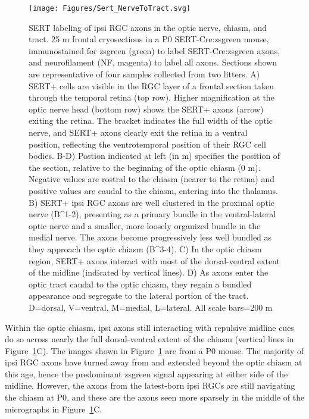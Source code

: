 \begin{figure}[hbtp]
	\begin{center}
		\texttt{[image: Figures/Sert\_NerveToTract.svg]}
		\caption[SERT labeling of ipsi RGC axons in the optic nerve, chiasm, and tract.]
		{SERT labeling of ipsi RGC axons in the optic nerve, chiasm, and tract. 
		25 \mu m frontal cryosections in a P0 SERT-Cre:zsgreen mouse, immunostained for zsgreen (green) to label SERT-Cre:zsgreen axons, and neurofilament (NF, magenta) to label all axons.
		Sections shown are representative of four samples collected from two litters. %
		A) SERT+ cells are visible in the RGC layer of a frontal section taken through the temporal retina (top row).
		Higher magnification at the optic nerve head (bottom row) shows the SERT+ axons (arrow) exiting the retina.
		The bracket indicates the full width of the optic nerve, and SERT+ axons clearly exit the retina in a ventral position, reflecting the ventrotemporal position of their RGC cell bodies.
		B-D) Postion indicated at left (in \mu m) specifies the position of the section, relative to the beginning of the optic chiasm (0 \mu m).
		Negative values are rostral to the chiasm (nearer to the retina) and positive values are caudal to the chiasm, entering into the thalamus.
		B) SERT+ ipsi RGC axons are well clustered in the proximal optic nerve (B^{1-2}), presenting as a primary bundle in the ventral-lateral optic nerve and a smaller, more loosely organized bundle in the medial nerve. 
		The axons become progressively less well bundled as they approach the optic chiasm (B^{3-4}). 
		C) In the optic chiasm region, SERT+ axons interact with most of the dorsal-ventral extent of the midline (indicated by vertical lines).
		D) As axons enter the optic tract caudal to the optic chiasm, they regain a bundled appearance and segregate to the lateral portion of the tract.
		D=dorsal, V=ventral, M=medial, L=lateral. 
		All scale bars=200 \mu m}
		\label{Figures/Sert_NerveToTract}
	\end{center}
\end{figure}

Within the optic chiasm, ipsi axons still interacting with repulsive midline cues do so across nearly the full dorsal-ventral extent of the chiasm (vertical lines in Figure~\ref{Figures/Sert_NerveToTract}C).
The images shown in Figure~\ref{Figures/Sert_NerveToTract} are from a P0 mouse.
The majority of ipsi RGC axons have turned away from and extended beyond the optic chiasm at this age, hence the predominant zsgreen signal appearing at either side of the midline.
However, the axons from the latest-born ipsi RGCs are still navigating the chiasm at P0, and these are the axons seen more sparsely in the middle of the micrographs in Figure~\ref{Figures/Sert_NerveToTract}C.

